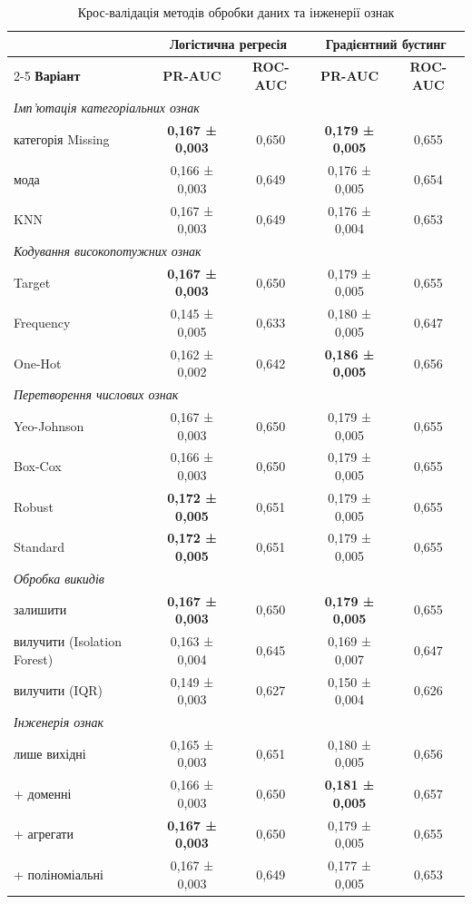 \documentclass[14pt,a4paper]{extreport}
\begin{document}
\begin{table}[H]
\caption{Крос-валідація методів обробки даних та інженерії ознак}
\label{tab:cv_prep}
\small
\renewcommand{\arraystretch}{1.15}
\begin{tabularx}{\linewidth}{|X|c|c|c|c|}
\hline
 & \multicolumn{2}{c|}{\textbf{Логістична регресія}} & \multicolumn{2}{c|}{\textbf{Градієнтний бустинг}} \\
\cline{2-5}
\textbf{Варіант} & \textbf{PR-AUC} & \textbf{ROC-AUC} & \textbf{PR-AUC} & \textbf{ROC-AUC} \\
\hline
\multicolumn{5}{|l|}{\textit{Імп'ютація категоріальних ознак}} \\
\hline
категорія Missing & \textbf{0,167 ± 0,003} & 0,650 & \textbf{0,179 ± 0,005} & 0,655 \\
\hline
мода & 0,166 ± 0,003 & 0,649 & 0,176 ± 0,005 & 0,654 \\
\hline
KNN & 0,167 ± 0,003 & 0,649 & 0,176 ± 0,004 & 0,653 \\
\hline
\multicolumn{5}{|l|}{\textit{Кодування високопотужних ознак}} \\
\hline
Target & \textbf{0,167 ± 0,003} & 0,650 & 0,179 ± 0,005 & 0,655 \\
\hline
Frequency & 0,145 ± 0,005 & 0,633 & 0,180 ± 0,005 & 0,647 \\
\hline
One-Hot & 0,162 ± 0,002 & 0,642 & \textbf{0,186 ± 0,005} & 0,656 \\
\hline
\multicolumn{5}{|l|}{\textit{Перетворення числових ознак}} \\
\hline
Yeo-Johnson & 0,167 ± 0,003 & 0,650 & 0,179 ± 0,005 & 0,655 \\
\hline
Box-Cox & 0,166 ± 0,003 & 0,650 & 0,179 ± 0,005 & 0,655 \\
\hline
Robust & \textbf{0,172 ± 0,005} & 0,651 & 0,179 ± 0,005 & 0,655 \\
\hline
Standard & \textbf{0,172 ± 0,005} & 0,651 & 0,179 ± 0,005 & 0,655 \\
\hline
\multicolumn{5}{|l|}{\textit{Обробка викидів}} \\
\hline
залишити & \textbf{0,167 ± 0,003} & 0,650 & \textbf{0,179 ± 0,005} & 0,655 \\
\hline
вилучити (Isolation Forest) & 0,163 ± 0,004 & 0,645 & 0,169 ± 0,007 & 0,647 \\
\hline
вилучити (IQR) & 0,149 ± 0,003 & 0,627 & 0,150 ± 0,004 & 0,626 \\
\hline
\multicolumn{5}{|l|}{\textit{Інженерія ознак}} \\
\hline
лише вихідні & 0,165 ± 0,003 & 0,651 & 0,180 ± 0,005 & 0,656 \\
\hline
+ доменні & 0,166 ± 0,003 & 0,650 & \textbf{0,181 ± 0,005} & 0,657 \\
\hline
+ агрегати & \textbf{0,167 ± 0,003} & 0,650 & 0,179 ± 0,005 & 0,655 \\
\hline
+ поліноміальні & 0,167 ± 0,003 & 0,649 & 0,177 ± 0,005 & 0,653 \\
\hline
\end{tabularx}
\end{table}
\end{document}
